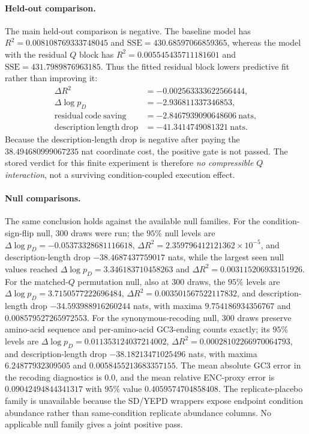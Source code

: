 \paragraph{Held-out comparison.}
The main held-out comparison is negative.  The baseline model has $R^2=0.008108769333748045$ and $\mathrm{SSE}=430.68597066859365$, whereas the model with the residual $Q$ block has $R^2=0.005545435711181601$ and $\mathrm{SSE}=431.7989876963185$.  Thus the fitted residual block lowers predictive fit rather than improving it:
$$\begin{aligned}
\Delta R^2 &= -0.002563333622566444,\\
\Delta\log p_D &= -2.936811337346853,\\
\mathrm{residual\ code\ saving} &= -2.8467939090648606\ \mathrm{nats},\\
\mathrm{description\ length\ drop} &= -41.3414749081321\ \mathrm{nats}.
\end{aligned}$$
Because the description-length drop is negative after paying the $38.494680999067235$ nat coordinate cost, the positive gate is not passed.  The stored verdict for this finite experiment is therefore \emph{no compressible $Q$ interaction}, not a surviving condition-coupled execution effect.

\paragraph{Null comparisons.}
The same conclusion holds against the available null families.  For the condition-sign-flip null, $300$ draws were run; the $95\%$ null levels are $\Delta\log p_D=-0.05373328681116618$, $\Delta R^2=2.359796412121362\times 10^{-5}$, and description-length drop $-38.4687437759017$ nats, while the largest seen null values reached $\Delta\log p_D=3.346183710458263$ and $\Delta R^2=0.003115206933151926$.  For the matched-$Q$ permutation null, also at $300$ draws, the $95\%$ levels are $\Delta\log p_D=3.7150577222696484$, $\Delta R^2=0.003501567522117832$, and description-length drop $-34.593988916260244$ nats, with maxima $9.754186934356767$ and $0.008579527265972553$.  For the synonymous-recoding null, $300$ draws preserve amino-acid sequence and per-amino-acid GC3-ending counts exactly; its $95\%$ levels are $\Delta\log p_D=0.011353124037214002$, $\Delta R^2=0.00028102266970064793$, and description-length drop $-38.18213471025496$ nats, with maxima $6.24877932309505$ and $0.0058455213683357155$.  The mean absolute GC3 error in the recoding diagnostics is $0.0$, and the mean relative ENC-proxy error is $0.09042494844341317$ with $95\%$ value $0.4059574704858408$.  The replicate-placebo family is unavailable because the SD/YEPD wrappers expose endpoint condition abundance rather than same-condition replicate abundance columns.  No applicable null family gives a joint positive pass.

